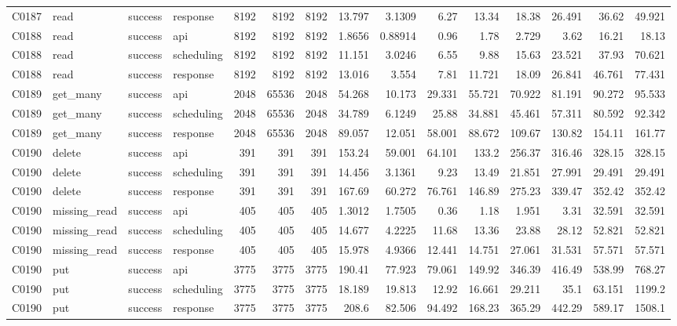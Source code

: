 \begin{landscape}
\begin{longtable}{llllrrrrrrrrrrr}
C0187 & read & success & response & 8192 & 8192 & 8192 & 13.797 & 3.1309 & 6.27 & 13.34 & 18.38 & 26.491 & 36.62 & 49.921\\
C0188 & read & success & api & 8192 & 8192 & 8192 & 1.8656 & 0.88914 & 0.96 & 1.78 & 2.729 & 3.62 & 16.21 & 18.13\\
C0188 & read & success & scheduling & 8192 & 8192 & 8192 & 11.151 & 3.0246 & 6.55 & 9.88 & 15.63 & 23.521 & 37.93 & 70.621\\
C0188 & read & success & response & 8192 & 8192 & 8192 & 13.016 & 3.554 & 7.81 & 11.721 & 18.09 & 26.841 & 46.761 & 77.431\\
C0189 & get\_\allowbreak{}many & success & api & 2048 & 65536 & 2048 & 54.268 & 10.173 & 29.331 & 55.721 & 70.922 & 81.191 & 90.272 & 95.533\\
C0189 & get\_\allowbreak{}many & success & scheduling & 2048 & 65536 & 2048 & 34.789 & 6.1249 & 25.88 & 34.881 & 45.461 & 57.311 & 80.592 & 92.342\\
C0189 & get\_\allowbreak{}many & success & response & 2048 & 65536 & 2048 & 89.057 & 12.051 & 58.001 & 88.672 & 109.67 & 130.82 & 154.11 & 161.77\\
C0190 & delete & success & api & 391 & 391 & 391 & 153.24 & 59.001 & 64.101 & 133.2 & 256.37 & 316.46 & 328.15 & 328.15\\
C0190 & delete & success & scheduling & 391 & 391 & 391 & 14.456 & 3.1361 & 9.23 & 13.49 & 21.851 & 27.991 & 29.491 & 29.491\\
C0190 & delete & success & response & 391 & 391 & 391 & 167.69 & 60.272 & 76.761 & 146.89 & 275.23 & 339.47 & 352.42 & 352.42\\
C0190 & missing\_\allowbreak{}read & success & api & 405 & 405 & 405 & 1.3012 & 1.7505 & 0.36 & 1.18 & 1.951 & 3.31 & 32.591 & 32.591\\
C0190 & missing\_\allowbreak{}read & success & scheduling & 405 & 405 & 405 & 14.677 & 4.2225 & 11.68 & 13.36 & 23.88 & 28.12 & 52.821 & 52.821\\
C0190 & missing\_\allowbreak{}read & success & response & 405 & 405 & 405 & 15.978 & 4.9366 & 12.441 & 14.751 & 27.061 & 31.531 & 57.571 & 57.571\\
C0190 & put & success & api & 3775 & 3775 & 3775 & 190.41 & 77.923 & 79.061 & 149.92 & 346.39 & 416.49 & 538.99 & 768.27\\
C0190 & put & success & scheduling & 3775 & 3775 & 3775 & 18.189 & 19.813 & 12.92 & 16.661 & 29.211 & 35.1 & 63.151 & 1199.2\\
C0190 & put & success & response & 3775 & 3775 & 3775 & 208.6 & 82.506 & 94.492 & 168.23 & 365.29 & 442.29 & 589.17 & 1508.1\\

\end{longtable}
\end{landscape}
